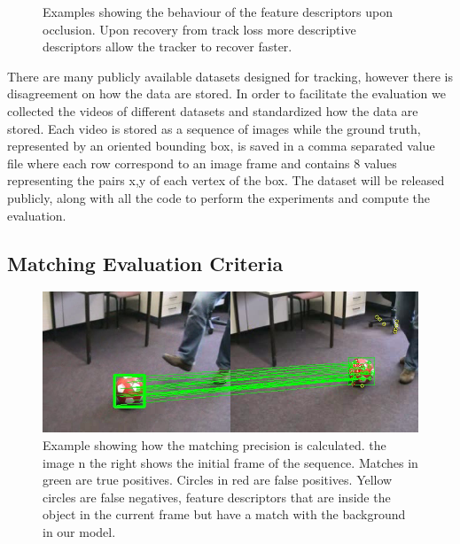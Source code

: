 \begin{figure}[t]
{	
	}
\caption{Examples showing the behaviour of the feature descriptors upon occlusion. Upon recovery from track loss more descriptive descriptors allow the tracker to recover faster.}
\vspace{-3mm}
\label{fig:tracking_results}
\end{figure}


There are many publicly available datasets designed for tracking, however there is disagreement on how the data are stored. In order to facilitate the evaluation we collected the videos of different datasets and standardized how the data are stored. Each video is stored as a sequence of images while the ground truth, represented by an oriented bounding box, is saved in a comma separated value file where each row correspond to an image frame and contains 8 values representing the pairs x,y of each vertex of the box. The dataset will be released publicly, along with all the code to perform the experiments and compute the evaluation.

\subsection{Matching Evaluation Criteria}

\begin{figure}[b]
	\includegraphics[width=0.95\linewidth]{imgs/matching.png}
\vspace{-2.5mm}	
\caption{Example showing how the matching precision is calculated. the image n the right shows the initial frame of the sequence. Matches in green are true positives. Circles in red are false positives. Yellow circles are false negatives, feature descriptors that are inside the object in the current frame but have a match with the background in our model.}
\label{fig:matching}
\end{figure}

